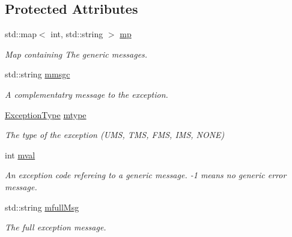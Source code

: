 \subsection*{Protected Attributes}
\begin{DoxyCompactItemize}
\item 
\hypertarget{classVishnuException_ab77135569ba3ca0d4ea97df7b1dfbb21}{
std::map$<$ int, std::string $>$ \hyperlink{classVishnuException_ab77135569ba3ca0d4ea97df7b1dfbb21}{mp}}
\label{classVishnuException_ab77135569ba3ca0d4ea97df7b1dfbb21}

\begin{DoxyCompactList}\small\item\em Map containing The generic messages. \item\end{DoxyCompactList}\item 
\hypertarget{classVishnuException_a57fffa81de4a47d1b2859f1b46362565}{
std::string \hyperlink{classVishnuException_a57fffa81de4a47d1b2859f1b46362565}{mmsgc}}
\label{classVishnuException_a57fffa81de4a47d1b2859f1b46362565}

\begin{DoxyCompactList}\small\item\em A complementatry message to the exception. \item\end{DoxyCompactList}\item 
\hypertarget{classVishnuException_afbac6f50e0096acb6fcec39415a1fb3f}{
\hyperlink{classVishnuException_ad9de1e07d1e54a454cd2f7f3883de001}{ExceptionType} \hyperlink{classVishnuException_afbac6f50e0096acb6fcec39415a1fb3f}{mtype}}
\label{classVishnuException_afbac6f50e0096acb6fcec39415a1fb3f}

\begin{DoxyCompactList}\small\item\em The type of the exception (UMS, TMS, FMS, IMS, NONE) \item\end{DoxyCompactList}\item 
\hypertarget{classVishnuException_aa9c23311f9ce4a48b7aeba210af55343}{
int \hyperlink{classVishnuException_aa9c23311f9ce4a48b7aeba210af55343}{mval}}
\label{classVishnuException_aa9c23311f9ce4a48b7aeba210af55343}

\begin{DoxyCompactList}\small\item\em An exception code refereing to a generic message. -\/1 means no generic error message. \item\end{DoxyCompactList}\item 
\hypertarget{classVishnuException_a5605d2d7aa6b3d69a9da046c7a3602e2}{
std::string \hyperlink{classVishnuException_a5605d2d7aa6b3d69a9da046c7a3602e2}{mfullMsg}}
\label{classVishnuException_a5605d2d7aa6b3d69a9da046c7a3602e2}

\begin{DoxyCompactList}\small\item\em The full exception message. \item\end{DoxyCompactList}\end{DoxyCompactItemize}


